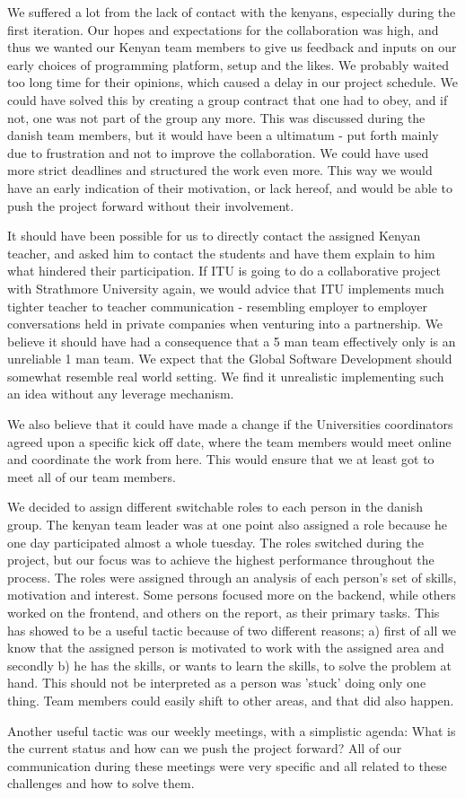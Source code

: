 We suffered a lot from the lack of contact with the kenyans, especially during the first iteration. Our hopes and expectations for the collaboration was high, and thus we wanted our Kenyan team members to give us feedback and inputs on our early choices of programming platform, setup and the likes. We probably waited too long time for their opinions, which caused a delay in our project schedule. We could have solved this by creating a group contract that one had to obey, and if not, one was not part of the group any more. This was discussed during the danish team members, but it would have been a ultimatum - put forth mainly due to frustration and not to improve the collaboration. We could have used more strict deadlines and structured the work even more. This way we would have an early indication of their motivation, or lack hereof, and would be able to push the project forward without their involvement. 

It should have been possible for us to directly contact the assigned Kenyan teacher, and asked him to contact the students and have them explain to him what hindered their participation. If ITU is going to do a collaborative project with Strathmore University again, we would advice that ITU implements much tighter teacher to teacher communication - resembling employer to employer conversations held in private companies when venturing into a partnership. We believe it should have had a consequence that a 5 man team effectively only is an unreliable 1 man team. We expect that the Global Software Development should somewhat resemble real world setting. We find it unrealistic implementing such an idea without any leverage mechanism.

We also believe that it could have made a change if the Universities coordinators agreed upon a specific kick off date, where the team members would meet online and coordinate the work from here. This would ensure that we at least got to meet all of our team members. 

We decided to assign different switchable roles to each person in the danish group. The kenyan team leader was at one point also assigned a role because he one day participated almost a whole tuesday. The roles switched during the project, but our focus was to achieve the highest performance throughout the process. The roles were assigned through an analysis of each person's set of skills, motivation and interest. Some persons focused more on the backend, while others worked on the frontend, and others on the report, as their primary tasks. This has showed to be a useful tactic because of two different reasons; a) first of all we know that the assigned person is motivated to work with the assigned area and secondly b) he has the skills, or wants to learn the skills, to solve the problem at hand. This should not be interpreted as a person was 'stuck' doing only one thing. Team members could easily shift to other areas, and that did also happen.

Another useful tactic was our weekly meetings, with a simplistic agenda: What is the current status and how can we push the project forward? All of our communication during these meetings were very specific and all related to these challenges and how to solve them.